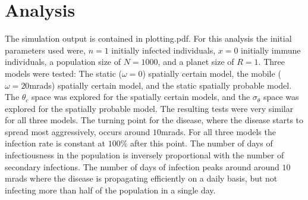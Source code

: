 \documentclass[10pt,a4paper]{article}
\begin{document}
\section{Analysis}
The simulation output is contained in plotting.pdf. For this analysis the initial parameters used were, $n=1$ initially infected individuals, $x=0$ initially immune individuals, a population size of $N=1000$, and a planet size of $R=1$.  Three models were tested: The static ($\omega = 0$) spatially certain model, the mobile ($\omega = 20$mrads) spatially certain model, and the static spatially probable model. The $\theta_c$ space was explored for the spatially certain models, and the $\sigma_\theta$ space was explored for the spatially probable model.  The resulting tests were very similar for all three models. The turning point for the disease, where the disease starts to spread most aggressively, occurs around $10$mrads.  For all three models the infection rate is constant at $100\%$ after this point. The number of days of infectiousness in the population is inversely proportional with the number of secondary infections. The number of days of infection peaks around around $10$mrads where the disease is propagating efficiently on a daily basis, but not infecting more than half of the population in a single day.
\end{document}
